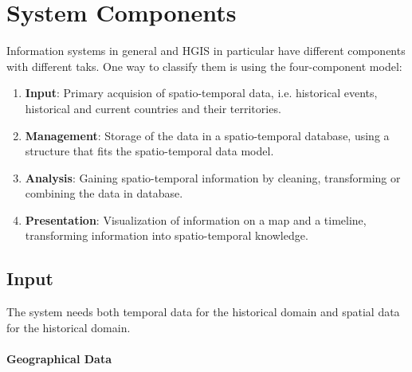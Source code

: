 
\section{System Components} %
\label{sec:system_components}

Information systems in general and HGIS in particular have different components with different taks. One way to classify them is using the four-component model:

\begin{enumerate}
  \item \textbf{Input}: Primary acquision of spatio-temporal data, i.e. historical events, historical and current countries and their territories.
  \item \textbf{Management}: Storage of the data in a spatio-temporal database, using a structure that fits the spatio-temporal data model.
  \item \textbf{Analysis}: Gaining spatio-temporal information by cleaning, transforming or combining the data in database.
  \item \textbf{Presentation}: Visualization of information on a map and a timeline, transforming information into spatio-temporal knowledge.
\end{enumerate}


\subsection{Input} %
\label{sub:input}

The system needs both temporal data for the historical domain and spatial data for the historical domain.

\paragraph{Geographical Data} %
\label{par:geographical_data_input}


